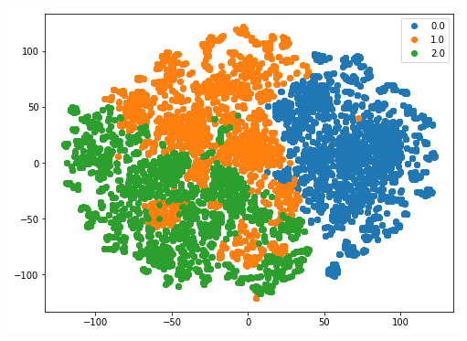 \documentclass[11pt]{article}
\begin{document}
\begin{center}
\begin{minipage}{0.49\linewidth}
\end{minipage}
\begin{minipage}{0.49\linewidth}
\includegraphics[width=\linewidth]{output_squeezeNet_v1_30epoch.png}
\end{minipage}
\end{center}
\end{document}

